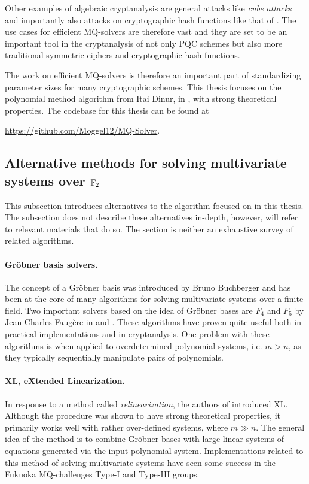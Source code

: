 Other examples of algebraic cryptanalysis are general attacks like \textit{cube attacks} \cite{Videau2011} and importantly also attacks on cryptographic hash functions like that of \cite{fse-2011-23547}. The use cases for efficient MQ-solvers are therefore vast and they are set to be an important tool in the cryptanalysis of not only PQC schemes but also more traditional symmetric ciphers and cryptographic hash functions. 

The work on efficient MQ-solvers is therefore an important part of standardizing parameter sizes for many cryptographic schemes. This thesis focuses on the polynomial method algorithm from Itai Dinur, in \cite{eurocrypt-2021-30841}, with strong theoretical properties. The codebase for this thesis can be found at 
\begin{center}
    \url{https://github.com/Moggel12/MQ-Solver}.
\end{center}

\subsection{Alternative methods for solving multivariate systems over $\mathbb{F}_2$}
This subsection introduces alternatives to the algorithm focused on in this thesis. The subsection does not describe these alternatives in-depth, however, will refer to relevant materials that do so. The section is neither an exhaustive survey of related algorithms.

\paragraph{Gröbner basis solvers.} The concept of a Gröbner basis was introduced by Bruno Buchberger and has been at the core of many algorithms for solving multivariate systems over a finite field. Two important solvers based on the idea of Gröbner bases are $F_4$ and $F_5$ by Jean-Charles Faugère in \cite{FAUGERE199961} and \cite{10.1145/780506.780516}. These algorithms have proven quite useful both in practical implementations and in cryptanalysis. One problem with these algorithms is when applied to overdetermined polynomial systems, i.e. $m > n$, as they typically sequentially manipulate pairs of polynomials. 

\paragraph{XL, eXtended Linearization.} In response to a method called \textit{relinearization}, the authors of \cite{eurocrypt-2000-2187} introduced XL. Although the procedure was shown to have strong theoretical properties, it primarily works well with rather over-defined systems, where $m \gg n$. The general idea of the method is to combine Gröbner bases with large linear systems of equations generated via the input polynomial system. Implementations related to this method of solving multivariate systems have seen some success in the Fukuoka MQ-challenges Type-I and Type-III groups. 

